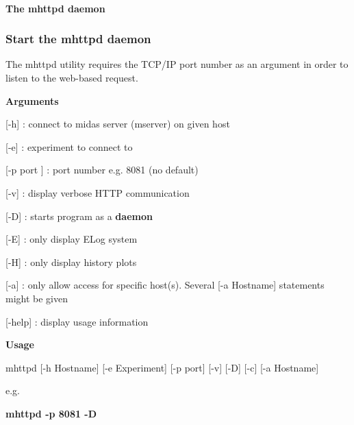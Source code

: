 \paragraph{The mhttpd daemon}\label{RC_mhttpd_utility}
\label{RC_mhttpd_utility_idx_mhttpd-utility}
\hypertarget{RC_mhttpd_utility_idx_mhttpd-utility}{}


\par
 \hypertarget{RC_mhttpd_utility_RC_mhttpd_Usage}{}\subsubsection{Start the mhttpd daemon}\label{RC_mhttpd_utility_RC_mhttpd_Usage}
The mhttpd utility requires the TCP/IP port number as an argument in order to listen to the web-\/based request.


\begin{DoxyItemize}
\item {\bfseries  Arguments }
\end{DoxyItemize}


\begin{DoxyItemize}
\item \mbox{[}-\/h\mbox{]} : connect to midas server (mserver) on given host
\item \mbox{[}-\/e\mbox{]} : experiment to connect to
\item \mbox{[}-\/p port \mbox{]} : port number e.g. 8081 (no default)
\item \mbox{[}-\/v\mbox{]} : display verbose HTTP communication
\item \mbox{[}-\/D\mbox{]} : starts program as a {\bfseries daemon} 
\item \mbox{[}-\/E\mbox{]} : only display ELog system
\item \mbox{[}-\/H\mbox{]} : only display history plots
\item \mbox{[}-\/a\mbox{]} : only allow access for specific host(s). Several \mbox{[}-\/a Hostname\mbox{]} statements might be given
\item \mbox{[}-\/help\mbox{]} : display usage information
\end{DoxyItemize}


\begin{DoxyItemize}
\item {\bfseries  Usage } \par
 mhttpd \mbox{[}-\/h Hostname\mbox{]} \mbox{[}-\/e Experiment\mbox{]} \mbox{[}-\/p port\mbox{]} \mbox{[}-\/v\mbox{]} \mbox{[}-\/D\mbox{]} \mbox{[}-\/c\mbox{]} \mbox{[}-\/a Hostname\mbox{]} \par
e.g. \par
 {\bfseries mhttpd -\/p 8081 -\/D }
\end{DoxyItemize}

